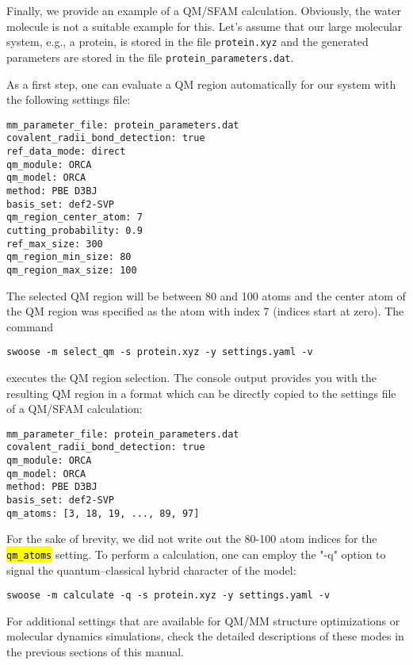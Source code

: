 \documentclass[]{tufte-book}
\begin{document}
{{Finally, we provide an example of a QM/SFAM calculation. Obviously, the water molecule is not a suitable example for this. Let's assume that our large molecular system, e.g., a protein, is stored in the file \texttt{protein.xyz} and the generated parameters are stored in the file \texttt{protein\_parameters.dat}.

As a first step, one can evaluate a QM region automatically for our system with the following settings file:
\begin{mdframed}[backgroundcolor=LightSteelBlue!25, linewidth=0pt]
\begin{verbatim}
mm_parameter_file: protein_parameters.dat
covalent_radii_bond_detection: true
ref_data_mode: direct
qm_module: ORCA
qm_model: ORCA
method: PBE D3BJ
basis_set: def2-SVP
qm_region_center_atom: 7
cutting_probability: 0.9
ref_max_size: 300
qm_region_min_size: 80
qm_region_max_size: 100
\end{verbatim}
\end{mdframed}
The selected QM region will be between 80 and 100 atoms and the center atom of the QM region was specified as the atom with index 7 (indices start at zero).
The command
\begin{mdframed}[backgroundcolor=LightSteelBlue!25, linewidth=0pt]
\begin{verbatim}
swoose -m select_qm -s protein.xyz -y settings.yaml -v
\end{verbatim}
\end{mdframed}
executes the QM region selection. The console output provides you with the resulting QM region in a format which can be directly copied to the settings file of a QM/SFAM calculation:
\begin{mdframed}[backgroundcolor=LightSteelBlue!25, linewidth=0pt]
\begin{verbatim}
mm_parameter_file: protein_parameters.dat
covalent_radii_bond_detection: true
qm_module: ORCA
qm_model: ORCA
method: PBE D3BJ
basis_set: def2-SVP
qm_atoms: [3, 18, 19, ..., 89, 97]
\end{verbatim}
\end{mdframed}
For the sake of brevity, we did not write out the 80-100 atom indices for the \hl{\texttt{qm\_atoms}} setting. To perform a calculation, one can employ the "-q" option to signal the quantum--classical hybrid character of the model:
\begin{mdframed}[backgroundcolor=LightSteelBlue!25, linewidth=0pt]
\begin{verbatim}
swoose -m calculate -q -s protein.xyz -y settings.yaml -v
\end{verbatim}
\end{mdframed}
For additional settings that are available for QM/MM structure optimizations or molecular dynamics simulations, check the detailed descriptions of these modes in the previous sections of this manual.


}}
\end{document}
